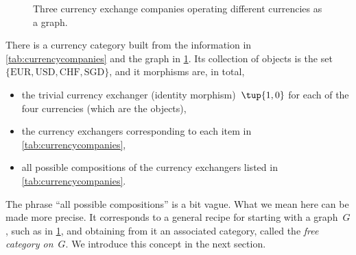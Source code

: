 \begin{figure}[h]
\begin{center}
\end{center}
\caption{Three currency exchange companies operating different currencies as a graph. \label{fig:currencygraph}}
\end{figure}

There is a currency category built from the information in \cref{tab:currencycompanies} and the graph in \cref{fig:currencygraph}. Its collection of objects is the set $\{  \text{EUR}, \text{USD}, \text{CHF}, \text{SGD} \}$, and it morphisms are, in total, 
\begin{itemize}
\item the trivial currency exchanger (identity morphism)~$\tup{1,0}$ for each of the four currencies (which are the objects),
\item the currency exchangers corresponding to each item in \cref{tab:currencycompanies},
\item all possible compositions of the currency exchangers listed in \cref{tab:currencycompanies}.
\end{itemize}

The phrase ``all possible compositions'' is a bit vague. What we mean here can be made more precise. It corresponds to a general recipe for starting with a graph~$G$, such as in \cref{fig:currencygraph}, and obtaining from it an associated category, called the \emph{free category on}~$G$. We introduce this concept in the next section. 

